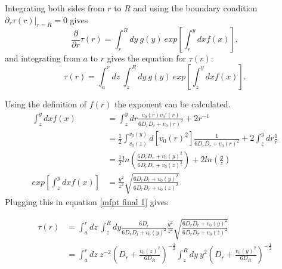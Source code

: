 \documentclass[paper=a4, fontsize=11pt]{scrartcl} %
\begin{document}
Integrating both sides from $r$ to $R$ and using the boundary condition $ \partial_r \tau(r) \bigg\rvert_{r=R} = 0$ gives
\begin{equation}\label{mfpt s2}
\frac{\partial}{\partial r} \tau(r) = \int_r^R dy\ g(y)\ exp\left[ \int_r^y dx f(x) \right],
\end{equation}
and integrating from $a$ to $r$ gives the equation for $\tau(r)$:
\begin{equation}\label{mfpt final 1}
\tau(r) = \int_a^rdz\ \int_z^R dy\ g(y)\ exp\left[ \int_z^y dx f(x) \right].
\end{equation}

Using the definition of $f(r)$ the exponent can be calculated.
\begin{align}\label{exp f}
\int_z^y dx f(x) & = \int_z^y dr \frac{v_0(r)v_0'(r)}{6D_r D_r + v_0(r)^2}  + 2r^{-1} \\
& = \frac{1}{2} \int_{v_0(z)}^{v_0(y)} d\left[v_0(r)^2\right] \frac{1}{6D_r D_r + v_0(r)^2}+ 2 \int_z^y dr \frac{1}{r} \\
& = \frac{1}{2} ln\left( \frac{6D_r D_r + v_0(y)^2}{6D_r D_r + v_0(z)^2} \right) + 2 ln\left( \frac{y}{z} \right) \\
exp\left[ \int_z^y dx f(x) \right] &= \frac{y^2}{z^2} \sqrt{\frac{6D_r D_r + v_0(y)^2}{6D_r D_r + v_0(z)^2}}
\end{align}
Plugging this in equation \ref{mfpt final 1} gives

\begin{align}
\tau(r) & = \int_a^rdz\ \int_z^R dy \frac{6D_r}{6D_r D_t + v_0(y)^2}
\frac{y^2}{z^2} \sqrt{\frac{6D_r D_r + v_0(y)^2}{6D_r D_r + v_0(z)^2}} \\
& = \int_a^rdz\  z^{-2} \left(D_r + \frac{v_0(z)^2}{6D_R} \right)^{-\frac{1}{2}}
\int_z^Rdy\
y^{2} \left(D_r +\frac{v_0(y)^2}{6D_R} \right)^{-\frac{1}{2}}
\end{align}
\end{document}
